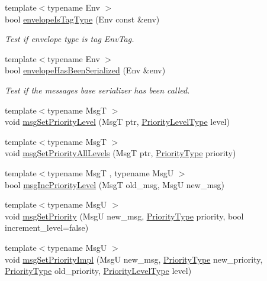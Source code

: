 \begin{DoxyCompactItemize}
{\footnotesize template$<$typename Env $>$ }\\bool \hyperlink{namespacevt_1_1messaging_a210f23c991eaf84274b744ac109ba72d}{envelope\+Is\+Tag\+Type} (Env const \&env)
\begin{DoxyCompactList}\small\item\em Test if envelope type is tag {\ttfamily Env\+Tag}. \end{DoxyCompactList}\item 
{\footnotesize template$<$typename Env $>$ }\\bool \hyperlink{namespacevt_1_1messaging_af984147f8c3e5bc9a34eb354ed2808d3}{envelope\+Has\+Been\+Serialized} (Env \&env)
\begin{DoxyCompactList}\small\item\em Test if the message\textquotesingle{}s base serializer has been called. \end{DoxyCompactList}\item 
{\footnotesize template$<$typename MsgT $>$ }\\void \hyperlink{namespacevt_1_1messaging_a5cca7f3fb7db0bfe14b3426ef9132090}{msg\+Set\+Priority\+Level} (MsgT ptr, \hyperlink{namespacevt_a53e07fdb3351b0f263e0dfd51b968d5e}{Priority\+Level\+Type} level)
\item 
{\footnotesize template$<$typename MsgT $>$ }\\void \hyperlink{namespacevt_1_1messaging_aae494e42c66a7b35346fd31d0100ebeb}{msg\+Set\+Priority\+All\+Levels} (MsgT ptr, \hyperlink{namespacevt_a86bff9f556eb761b27fc8600d006ac04}{Priority\+Type} priority)
\item 
{\footnotesize template$<$typename MsgT , typename MsgU $>$ }\\bool \hyperlink{namespacevt_1_1messaging_a6ee5ed1aac4e553185dc3fe80544ac2a}{msg\+Inc\+Priority\+Level} (MsgT old\+\_\+msg, MsgU new\+\_\+msg)
\item 
{\footnotesize template$<$typename MsgU $>$ }\\void \hyperlink{namespacevt_1_1messaging_ab8115ae64f9c390e7a92f3f02aea8454}{msg\+Set\+Priority} (MsgU new\+\_\+msg, \hyperlink{namespacevt_a86bff9f556eb761b27fc8600d006ac04}{Priority\+Type} priority, bool increment\+\_\+level=false)
\item 
{\footnotesize template$<$typename MsgU $>$ }\\void \hyperlink{namespacevt_1_1messaging_ad71afa970305de275db8e91a5041d8e9}{msg\+Set\+Priority\+Impl} (MsgU new\+\_\+msg, \hyperlink{namespacevt_a86bff9f556eb761b27fc8600d006ac04}{Priority\+Type} new\+\_\+priority, \hyperlink{namespacevt_a86bff9f556eb761b27fc8600d006ac04}{Priority\+Type} old\+\_\+priority, \hyperlink{namespacevt_a53e07fdb3351b0f263e0dfd51b968d5e}{Priority\+Level\+Type} level)

\end{DoxyCompactItemize}
